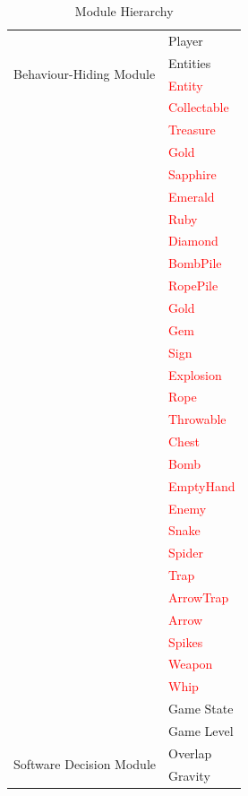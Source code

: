 \documentclass[12pt, titlepage]{article}
\begin{document}
\begin{table}[H]
\begin{tabular}{p{} p{}}
\multirow{4}{0.3\textwidth}{Behaviour-Hiding Module} & Player \\
& Entities \\
& \textcolor{red}{Entity} \\
& \textcolor{red}{Collectable} \\
& \textcolor{red}{Treasure} \\
& \textcolor{red}{Gold} \\
& \textcolor{red}{Sapphire} \\
& \textcolor{red}{Emerald} \\
& \textcolor{red}{Ruby} \\
& \textcolor{red}{Diamond} \\
& \textcolor{red}{BombPile} \\
& \textcolor{red}{RopePile} \\
& \textcolor{red}{Gold} \\
& \textcolor{red}{Gem} \\
& \textcolor{red}{Sign}\\
& \textcolor{red}{Explosion}\\
& \textcolor{red}{Rope}\\
& \textcolor{red}{Throwable}\\
& \textcolor{red}{Chest}\\
& \textcolor{red}{Bomb}\\
& \textcolor{red}{EmptyHand}\\
& \textcolor{red}{Enemy}\\
& \textcolor{red}{Snake}\\
& \textcolor{red}{Spider}\\
& \textcolor{red}{Trap}\\
& \textcolor{red}{ArrowTrap}\\
& \textcolor{red}{Arrow}\\
& \textcolor{red}{Spikes}\\
& \textcolor{red}{Weapon}\\
& \textcolor{red}{Whip}\\
& Game State \\
& Game Level\\
\midrule


\multirow{2}{0.3\textwidth}{Software Decision Module}
& Overlap\\
& Gravity\\
\bottomrule

\end{tabular}
\caption{Module Hierarchy}
\label{TblMH}
\end{table}
\end{document}
